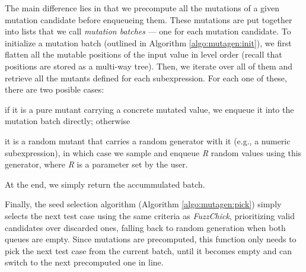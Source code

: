 \documentclass[acmsmall, anonymous]{acmart}
\newcommand{\fuzzchick}{\textit{FuzzChick}\xspace}
\begin{document}
The main difference lies in that we precompute all the mutations of a given
mutation candidate before enqueueing them.
%
These mutations are put together into lists that we call \emph{mutation batches}
--- one for each mutation candidate.
%
To initialize a mutation batch (outlined in Algorithm \ref{algo:mutagen:init}),
we first flatten all the mutable positions of the input value in level order
(recall that positions are stored as a multi-way tree).
%
Then, we iterate over all of them and retrieve all the mutants defined for each
subexpression.
%
For each one of these, there are two posible cases:
%
\begin{inparaenum}
\item if it is a pure mutant carrying a concrete mutated value, we enqueue it
  into the mutation batch directly; otherwise
\item it is a random mutant that carries a random generator with it (e.g., a
  numeric subexpression), in which case we sample and enqueue \textit{R} random
  values using this generator, where \textit{R} is a parameter set by the user.
\end{inparaenum}
%
At the end, we simply return the accummulated batch.


Finally, the seed selection algorithm (Algorithm \ref{algo:mutagen:pick}) simply
selects the next test case using the same criteria as \fuzzchick, prioritizing
valid candidates over discarded ones, falling back to random generation when
both queues are empty.
%
Since mutations are precomputed, this function only needs to pick the next test
case from the current batch, until it becomes empty and can switch to the next
precomputed one in line.
\end{document}
